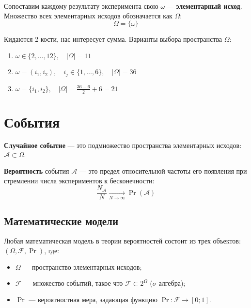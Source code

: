 \begin{definition}
    Сопоставим каждому результату эксперимента свою $\omega$ --- \textbf{элементарный исход}. Множество всех элементарных исходов обозначается как $\Omega$:
    \[
        \Omega = \{\omega\}
    \]
\end{definition}

\begin{example}
    Кидаются 2 кости, нас интересует сумма. Варианты выбора пространства $\Omega$:
    \begin{enumerate}[label=\arabic*)]
        \item $\omega \in \{2, \dots, 12\}, \quad |\Omega| = 11$
        \item $\omega = (i_1, i_2), \quad i_j \in \{1, \dots, 6\}, \quad |\Omega| = 36$
        \item $\omega = \{i_1, i_2\}, \quad |\Omega| = \frac{36-6}{2} + 6 = 21$
    \end{enumerate}
\end{example}

\section{События}

\begin{definition}
    \textbf{Случайное событие} --- это подмножество пространства элементарных исходов: $\mathcal{A} \subset \Omega$.
\end{definition}

\begin{definition}[Вероятность]
    \textbf{Вероятность} события $\mathcal{A}$ --- это предел относительной частоты его появления при стремлении числа экспериментов к бесконечности:
    \[
        \frac{N_{\mathcal{A}}}{N} \xrightarrow[N \to \infty]{} \Pr(\mathcal{A})
    \]
\end{definition}

\subsection{Математические модели}

\begin{definition}
    Любая математическая модель в теории вероятностей состоит
    из трех объектов: $(\Omega, \mathcal{F}, \Pr)$, где:
    \begin{itemize}
        \item $\Omega$ --- пространство элементарных исходов;
        \item $\mathcal{F}$ --- множество событий, такое что
        $\mathcal{F} \subset 2^{\Omega}$ ($\sigma$-алгебра);
        \item $\Pr$ --- вероятностная мера, задающая функцию
        $\Pr \colon \mathcal{F} \to [0; 1]$.
    \end{itemize}
\end{definition}

